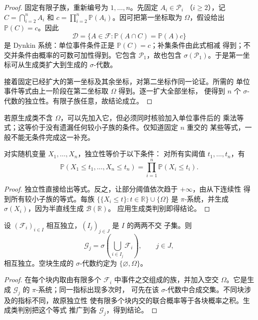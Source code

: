 \begin{proof}
固定有限子族，重新编号为 $1,\ldots,n$。先固定 $A_i\in\mathcal P_i$
（$i\ge2$），记 $C=\bigcap_{i=2}^nA_i$ 和
$c=\prod_{i=2}^n\mathbb P(A_i)$。因可把第一坐标取为 $\Omega$，假设给出
$\mathbb P(C)=c$。因此
\[
 \mathcal D=\{A\in\mathcal F:\mathbb P(A\cap C)=\mathbb P(A)c\}
\]
是 Dynkin 系统：单位事件条件正是 $\mathbb P(C)=c$；补集条件由此式相减
得到；不交并条件由概率的可数可加性得到。它包含 $\mathcal P_1$，故也包含
$\sigma(\mathcal P_1)$。于是第一坐标可从生成类扩大到生成的 $\sigma$-代数。

接着固定已经扩大的第一坐标及其余坐标，对第二坐标作同一论证。所需的
单位事件等式由上一阶段在第二坐标取 $\Omega$ 得到。逐一扩大全部坐标，
便得到 $n$ 个 $\sigma$-代数的独立性。有限子族任意，故结论成立。
\end{proof}

若原生成类不含 $\Omega$，可以先加入它，但必须同时核验加入单位事件后的
乘法等式；这等价于没有遗漏任何较小子族的条件。仅知道固定 $n$ 重交的
某些等式，一般不能无条件完成这一补充。

\begin{corollary}[分布函数判别]
\label{cor:independence-cdf-test}
对实随机变量 $X_1,\ldots,X_n$，独立性等价于以下条件：
对所有实阈值 $t_1,\ldots,t_n$，有
\[
 \mathbb P(X_1\le t_1,\ldots,X_n\le t_n)
 =\prod_{i=1}^n\mathbb P(X_i\le t_i).
\]
\end{corollary}

\begin{proof}
独立性直接给出等式。反之，让部分阈值依次趋于 $+\infty$，由从下连续性
得到所有较小子族的等式。每族
$\{\{X_i\le t\}:t\in\mathbb R\}\cup\{\Omega\}$ 是 $\pi$-系统，并生成
$\sigma(X_i)$，因为半直线生成 $\mathcal B(\mathbb R)$。
应用生成类判别即得结论。
\end{proof}

\begin{proposition}[分块独立]
\label{prop:independent-blocks}
设 $(\mathcal F_i)_{i\in I}$ 相互独立，$(I_j)_{j\in J}$ 是 $I$ 的两两不交
子集。则
\[
 \mathcal G_j=\sigma\left(\bigcup_{i\in I_j}\mathcal F_i\right),\qquad j\in J,
\]
相互独立。空块生成的 $\sigma$-代数约定为 $\{\varnothing,\Omega\}$。
\end{proposition}

\begin{proof}
在每个块内取由有限多个 $\mathcal F_i$ 中事件之交组成的族，并加入空交
$\Omega$。它是生成 $\mathcal G_j$ 的 $\pi$-系统；同一指标出现多次时，
可先在该 $\sigma$-代数中合成交集。不同块涉及的指标不同，故原独立性
使有限多个块内交的联合概率等于各块概率之积。生成类判别把这个等式
推广到各 $\mathcal G_j$，得到结论。
\end{proof}

